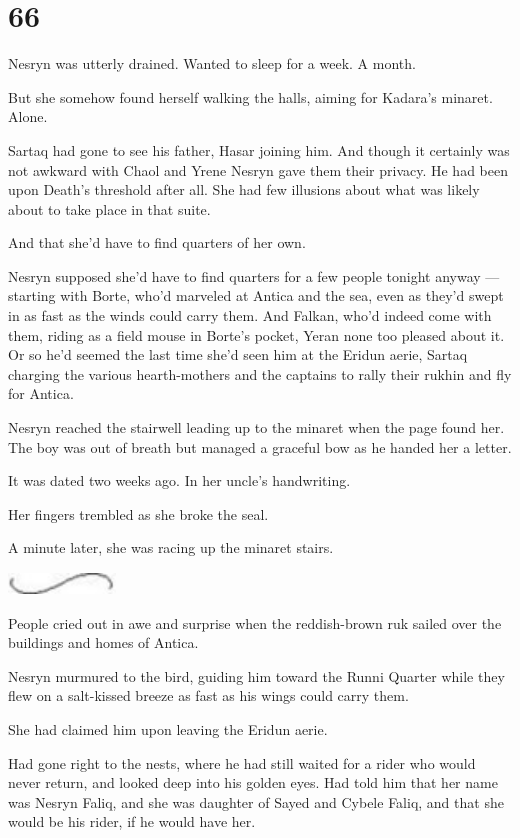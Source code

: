 
\chapter{66}

Nesryn was utterly drained. Wanted to sleep for a week. A month.

But she somehow found herself walking the halls, aiming for Kadara's minaret. Alone.

Sartaq had gone to see his father, Hasar joining him. And though it certainly was not awkward with Chaol and Yrene  Nesryn gave them their privacy. He had been upon Death's threshold after all. She had few illusions about what was likely about to take place in that suite.

And that she'd have to find quarters of her own.

Nesryn supposed she'd have to find quarters for a few people tonight anyway ---starting with Borte, who'd marveled at Antica and the sea, even as they'd swept in as fast as the winds could carry them. And Falkan, who'd indeed come with them, riding as a field mouse in Borte's pocket, Yeran none too pleased about it. Or so he'd seemed the last time she'd seen him at the Eridun aerie, Sartaq charging the various hearth-mothers and the captains to rally their rukhin and fly for Antica.

Nesryn reached the stairwell leading up to the minaret when the page found her. The boy was out of breath but managed a graceful bow as he handed her a letter.

It was dated two weeks ago. In her uncle's handwriting.

Her fingers trembled as she broke the seal.

A minute later, she was racing up the minaret stairs.

\includegraphics[width=1.12in,height=0.24in]{images/seperator}

People cried out in awe and surprise when the reddish-brown ruk sailed over the buildings and homes of Antica.

Nesryn murmured to the bird, guiding him toward the Runni Quarter while they flew on a salt-kissed breeze as fast as his wings could carry them.

She had claimed him upon leaving the Eridun aerie.

Had gone right to the nests, where he had still waited for a rider who would never return, and looked deep into his golden eyes. Had told him that her name was Nesryn Faliq, and she was daughter of Sayed and Cybele Faliq, and that she would be his rider, if he would have her.

